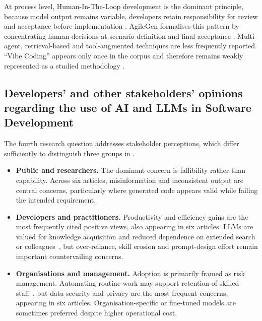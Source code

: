 At process level, Human-In-The-Loop development is the dominant principle, because model output remains variable, developers retain responsibility for review and acceptance before implementation \cite{Kim:2025ao}. AgileGen formalises this pattern by concentrating human decisions at scenario definition and final acceptance \cite{Zhang:2025ea}. Multi-agent, retrieval-based and tool-augmented techniques are less frequently reported. ``Vibe Coding'' appears only once in the corpus and therefore remains weakly represented as a studied methodology \cite{Moore:2025vc}.


\subsection{Developers' and other stakeholders' opinions regarding the use of AI and LLMs in Software Development}

The fourth research question addresses stakeholder perceptions, which differ sufficiently to distinguish three groups in .

\begin{itemize}[leftmargin=0.6cm, itemsep=0.35em]

\item \textbf{Public and researchers.} The dominant concern is fallibility rather than capability. Across six articles, misinformation and inconsistent output are central concerns, particularly where generated code appears valid while failing the intended requirement.

\item \textbf{Developers and practitioners.} Productivity and efficiency gains are the most frequently cited positive views, also appearing in six articles. \acp{LLM} are valued for knowledge acquisition and reduced dependence on extended search or colleagues~\cite{Banh:2025cf}, but over-reliance, skill erosion and prompt-design effort remain important countervailing concerns.

\item \textbf{Organisations and management.} Adoption is primarily framed as risk management. Automating routine work may support retention of skilled staff~\cite{Jensen:2025me}, but data security and privacy are the most frequent concerns, appearing in six articles. Organisation-specific or fine-tuned models are sometimes preferred despite higher operational cost.

\end{itemize}

